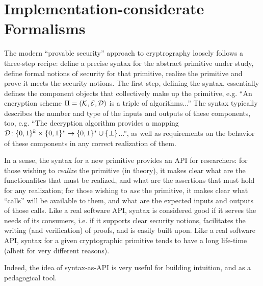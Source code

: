\section{Implementation-considerate Formalisms}
The modern ``provable security'' approach to cryptrography loosely follows a
three-step recipe: define a precise syntax for the abstract primitive under
study, define formal notions of security for that primitive, realize the
primitive and prove it meets the security notions.  The first step, defining the
syntax, essentially defines the component objects that collectively make up the
primitive, e.g. ``An encryption scheme $\Pi=(\mathcal{K},\mathcal{E},\mathcal{D})$ is a triple of
algorithms...''  The syntax typically describes the number and type of the
inputs and outputs of these components, too, e.g. ``The decryption algorithm
provides a mapping $\mathcal{D}\colon\{0,1\}^{k}\times\{0,1\}^* \to \{0,1\}^* \cup
\{\bot\}$...'', as well as requirements on the behavior of these components in
any correct realization of them.

In a sense, the syntax for a new primitive provides an API for researchers: for
those wishing to \emph{realize} the primitive (in theory), it makes clear what
are the functionalites that must be realized, and what are the assertions that
must hold for any realization; for those wishing to \emph{use} the primitive, it
makes clear what ``calls'' will be available to them, and what are the expected
inputs and outputs of those calls.
%
Like a real software API, syntax is considered good if it serves the needs of
its consumers, i.e. if it supports clear security notions, facilitates the
writing (and verification) of proofs, and is easily built upon.
%
Like a real software API, syntax for a given cryptographic primitive tends to
have a long life-time (albeit for very different reasons).
%
Indeed, the idea of syntax-as-API is very useful for building intuition, and as
a pedagogical tool.


